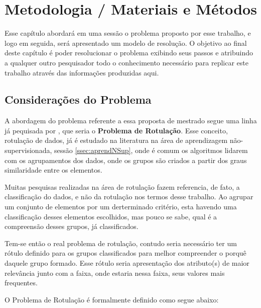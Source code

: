 \chapter{Metodologia / Materiais e Métodos}\label{cap:ferramentas}
Esse capítulo abordará em uma sessão o problema proposto por esse trabalho, e logo em seguida, será apresentado um modelo de resolução. O objetivo ao final deste capítulo é poder resolucionar o problema exibindo seus passos e atribuindo a qualquer outro pesquisador todo o conhecimento necessário para replicar este trabalho através das informações produzidas aqui.

\section{Considerações do Problema}

A abordagem do problema referente a essa proposta de mestrado segue uma linha já pequisada por \cite{Lopes}, que seria o \textbf{Problema de Rotulação}. Esse conceito, rotulação de dados,  já é estudado na literatura na área de aprendizagem não-supervisionada, sessão \ref{ssec:aprendNSup}, onde é comum os algoritmos lidarem com os agrupamentos dos dados, onde os grupos são criados a partir dos graus similaridade entre os elementos.

Muitas pesquisas realizadas na área de rotulação fazem referencia, de fato, a classificação do dados, e não da rotulação nos termos desse trabalho. Ao agrupar um conjunto de elementos por um derterminado critério, esta havendo uma classificação desses elementos escolhidos, mas pouco se sabe, qual é a compreensão desses grupos, já classificados. 

Tem-se então o real problema de rotulação, contudo seria necessário ter um rótulo definido para os grupos classificados para melhor compreender o porquê daquele grupo formado. Esse rótulo seria apresentação dos atributo(s) de maior relevância junto com a faixa, onde estaria nessa faixa, seus valores mais frequentes.

O Problema de Rotulação é formalmente definido como segue abaixo:


